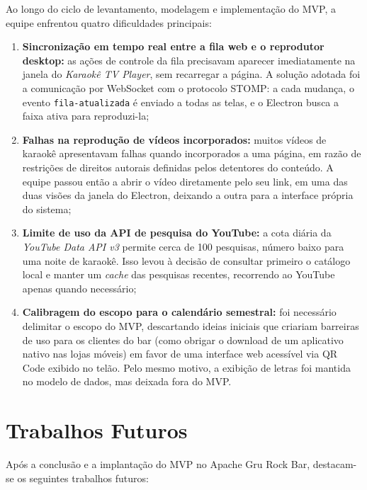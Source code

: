 Ao longo do ciclo de levantamento, modelagem e implementação do MVP, a equipe enfrentou quatro dificuldades principais:

\begin{enumerate}
  \item \textbf{Sincronização em tempo real entre a fila web e o reprodutor desktop:} as ações de controle da fila precisavam aparecer imediatamente na janela do \textit{Karaokê TV Player}, sem recarregar a página. A solução adotada foi a comunicação por WebSocket com o protocolo STOMP: a cada mudança, o evento \texttt{fila-atualizada} é enviado a todas as telas, e o Electron busca a faixa ativa para reproduzi-la;
  \item \textbf{Falhas na reprodução de vídeos incorporados:} muitos vídeos de karaokê apresentavam falhas quando incorporados a uma página, em razão de restrições de direitos autorais definidas pelos detentores do conteúdo. A equipe passou então a abrir o vídeo diretamente pelo seu link, em uma das duas visões da janela do Electron, deixando a outra para a interface própria do sistema;
  \item \textbf{Limite de uso da API de pesquisa do YouTube:} a cota diária da \textit{YouTube Data API v3} permite cerca de 100 pesquisas, número baixo para uma noite de karaokê. Isso levou à decisão de consultar primeiro o catálogo local e manter um \textit{cache} das pesquisas recentes, recorrendo ao YouTube apenas quando necessário;
  \item \textbf{Calibragem do escopo para o calendário semestral:} foi necessário delimitar o escopo do MVP, descartando ideias iniciais que criariam barreiras de uso para os clientes do bar (como obrigar o download de um aplicativo nativo nas lojas móveis) em favor de uma interface web acessível via QR Code exibido no telão. Pelo mesmo motivo, a exibição de letras foi mantida no modelo de dados, mas deixada fora do MVP.
\end{enumerate}

\section{Trabalhos Futuros} \label{sec:trabalhos_futuros}

Após a conclusão e a implantação do MVP no Apache Gru Rock Bar, destacam-se os seguintes trabalhos futuros:

